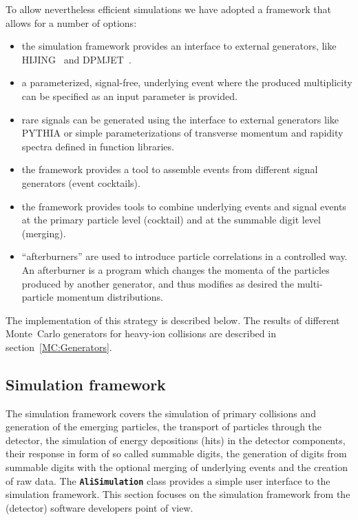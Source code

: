 \documentclass[12pt,a4paper,twoside]{article}
\makeatletter
\newcommand{\class}[1]{\texttt{\textbf{#1}}\xspace}
\newcommand {\MC} {Monte~Carlo\@\xspace}
\makeatother
\begin{document}
To allow nevertheless efficient simulations we have adopted a
framework that allows for a number of options:


\begin{itemize}
\item{} the simulation framework provides an interface to external
  generators, like HIJING~\cite{MC:HIJING} and
  DPMJET~\cite{MC:DPMJET}.

\item{} a parameterized, signal-free, underlying event where the
  produced multiplicity can be specified as an input parameter is
  provided.

\item{} rare signals can be generated using the interface to external
  generators like PYTHIA or simple parameterizations of transverse
  momentum and rapidity spectra defined in function libraries.

\item{} the framework provides a tool to assemble events from
  different signal generators (event cocktails).

\item{} the framework provides tools to combine underlying events and
  signal events at the primary particle level (cocktail) and at the
  summable digit level (merging).

\item{} ``afterburners'' are used to introduce particle correlations in a
  controlled way. An afterburner is a program which changes the
  momenta of the particles produced by another generator, and thus
  modifies as desired the multi-particle momentum distributions.
\end{itemize}

The implementation of this strategy is described below. The results of
different \MC generators for heavy-ion collisions are
described in section~\ref{MC:Generators}.

\subsection{Simulation framework}

The simulation framework covers the simulation of primary collisions
and generation of the emerging particles, the transport of particles
through the detector, the simulation of energy depositions (hits) in
the detector components, their response in form of so called summable
digits, the generation of digits from summable digits with the
optional merging of underlying events and the creation of raw data.
The \class{AliSimulation} class provides a simple user interface to
the simulation framework. This section focuses on the simulation
framework from the (detector) software developers point of view.
\end{document}
